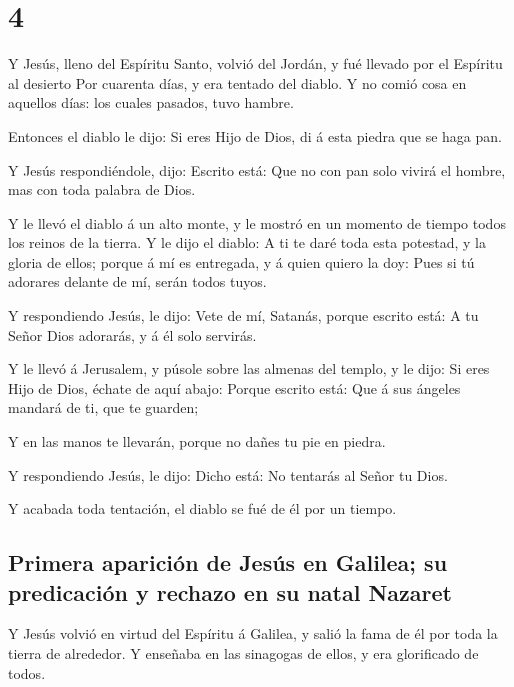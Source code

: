 \hypertarget{section-3}{%
\section{4}\label{section-3}}

 Y Jesús, lleno del Espíritu Santo, volvió del Jordán, y
fué llevado por el Espíritu al desierto  Por cuarenta
días, y era tentado del diablo. Y no comió cosa en aquellos días: los
cuales pasados, tuvo hambre.

 Entonces el diablo le dijo: Si eres Hijo de Dios, di á
esta piedra que se haga pan.

 Y Jesús respondiéndole, dijo: Escrito está: Que no con
pan solo vivirá el hombre, mas con toda palabra de Dios.

 Y le llevó el diablo á un alto monte, y le mostró en un
momento de tiempo todos los reinos de la tierra.  Y le
dijo el diablo: A ti te daré toda esta potestad, y la gloria de ellos;
porque á mí es entregada, y á quien quiero la doy:  Pues
si tú adorares delante de mí, serán todos tuyos.

 Y respondiendo Jesús, le dijo: Vete de mí, Satanás,
porque escrito está: A tu Señor Dios adorarás, y á él solo servirás.

 Y le llevó á Jerusalem, y púsole sobre las almenas del
templo, y le dijo: Si eres Hijo de Dios, échate de aquí abajo:
 Porque escrito está: Que á sus ángeles mandará de ti,
que te guarden;

 Y en las manos te llevarán, porque no dañes tu pie en
piedra.

 Y respondiendo Jesús, le dijo: Dicho está: No tentarás
al Señor tu Dios.

 Y acabada toda tentación, el diablo se fué de él por un
tiempo.

\hypertarget{primera-apariciuxf3n-de-jesuxfas-en-galilea-su-predicaciuxf3n-y-rechazo-en-su-natal-nazaret}{%
\subsection{Primera aparición de Jesús en Galilea; su predicación y
rechazo en su natal
Nazaret}\label{primera-apariciuxf3n-de-jesuxfas-en-galilea-su-predicaciuxf3n-y-rechazo-en-su-natal-nazaret}}

 Y Jesús volvió en virtud del Espíritu á Galilea, y salió
la fama de él por toda la tierra de alrededor.  Y
enseñaba en las sinagogas de ellos, y era glorificado de todos.

